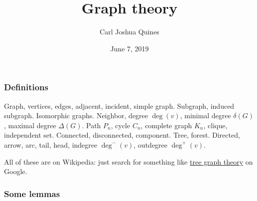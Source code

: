 \documentclass[11pt,paper=letter]{scrartcl}
\begin{document}
\title{Graph theory}
\author{Carl Joshua Quines}
\date{June 7, 2019}

\maketitle

\subsubsection*{Definitions}

Graph, vertices, edges, adjacent, incident, simple graph. Subgraph, induced subgraph. Isomorphic graphs. Neighbor, degree $\deg(v)$, minimal degree $\delta(G)$, maximal degree $\Delta(G)$. Path $P_n$, cycle $C_n$, complete graph $K_n$, clique, independent set. Connected, disconnected, component. Tree, forest. Directed, arrow, arc, tail, head, indegree $\deg^-(v)$, outdegree $\deg^+(v)$.

All of these are on Wikipedia: just search for something like \href{https://www.google.com/search?q=tree+graph+theory}{tree graph theory} on Google.

\subsubsection*{Some lemmas}
\end{document}
